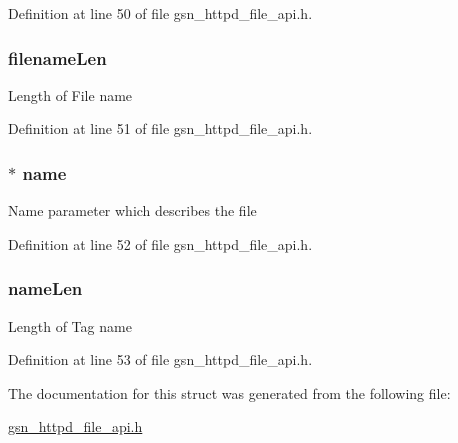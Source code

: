 Definition at line 50 of file gsn\_\-httpd\_\-file\_\-api.h.

\hypertarget{a00463_a461cd3bb3ee35a9c12aaf4b124183712}{
\subsubsection[{filenameLen}]{ {\bf filenameLen}}}
\label{a00463_a461cd3bb3ee35a9c12aaf4b124183712}
Length of File name 

Definition at line 51 of file gsn\_\-httpd\_\-file\_\-api.h.

\hypertarget{a00463_a0223d2eb5edfad56f8aecd69a1e63b4b}{
\subsubsection[{name}]{$\ast$ {\bf name}}}
\label{a00463_a0223d2eb5edfad56f8aecd69a1e63b4b}
Name parameter which describes the file 

Definition at line 52 of file gsn\_\-httpd\_\-file\_\-api.h.

\hypertarget{a00463_a9dddb53eeb9ed9a2cc273d535b0faaa8}{
\subsubsection[{nameLen}]{ {\bf nameLen}}}
\label{a00463_a9dddb53eeb9ed9a2cc273d535b0faaa8}
Length of Tag name 

Definition at line 53 of file gsn\_\-httpd\_\-file\_\-api.h.



The documentation for this struct was generated from the following file:\begin{DoxyCompactItemize}
\item 
\hyperlink{a00511}{gsn\_\-httpd\_\-file\_\-api.h}\end{DoxyCompactItemize}
